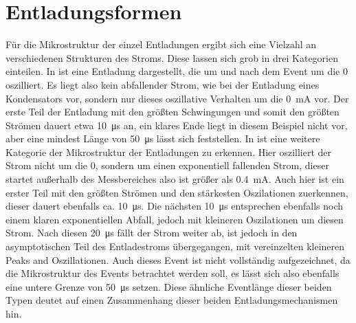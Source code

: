 \section{Entladungsformen}
\label{sec:dischargeforms}
Für die Mikrostruktur der einzel Entladungen ergibt sich eine Vielzahl an verschiedenen Strukturen des Stroms. Diese lassen sich grob in drei Kategorien einteilen. In  ist eine Entladung dargestellt, die um und nach dem Event um die 0 oszilliert. Es liegt also kein abfallender Strom, wie bei der Entladung eines Kondensators vor, sondern nur dieses oszillative Verhalten um die \SI{0}{\milli\ampere} vor. Der erste Teil der Entladung mit den größten Schwingungen und somit den größten Strömen dauert etwa \SI{10}{\micro\second} an, ein klares Ende liegt in diesem Beispiel nicht vor, aber eine mindest Länge von \SI{50}{\micro\second} lässt sich feststellen.
In  ist eine weitere Kategorie der Mikrostruktur der Entladungen zu erkennen. Hier oszilliert der Strom nicht um die 0, sondern um einen exponentiell fallenden Strom, dieser startet außerhalb des Messbereiches also ist größer als \SI{0,4}{\milli\ampere}. Auch hier ist ein erster Teil mit den größten Strömen und den stärkesten Oszilationen zuerkennen, dieser dauert ebenfalls ca. \SI{10}{\micro\second}. Die nächsten \SI{10}{\micro\second} entsprechen ebenfalls noch einem klaren exponentiellen Abfall, jedoch mit kleineren Oszilationen um diesen Strom. Nach diesen \SI{20}{\micro\second} fällt der Strom weiter ab, ist jedoch in den asymptotischen Teil des Entladestroms übergegangen, mit vereinzelten kleineren Peaks and Oszillationen. Auch dieses Event ist nicht vollständig aufgezeichnet, da die Mikrostruktur des Events betrachtet werden soll, es lässt sich also ebenfalls eine untere Grenze von \SI{50}{\micro\second} setzen. Diese ähnliche Eventlänge dieser beiden Typen deutet auf einen Zusammenhang dieser beiden Entladungsmechanismen hin.

